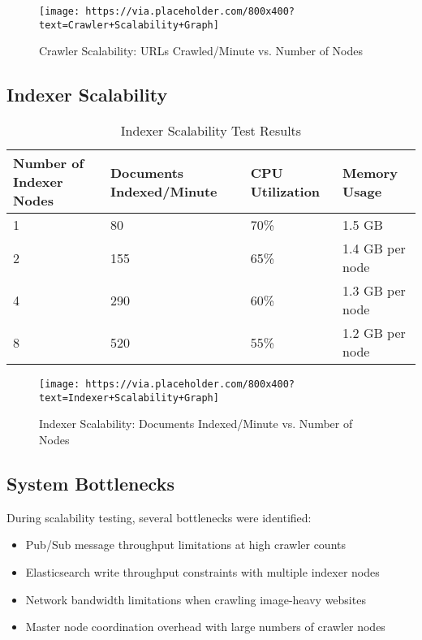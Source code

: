 \documentclass[12pt,a4paper]{report}
\begin{document}
\begin{figure}[H]
    \centering
    \texttt{[image: https://via.placeholder.com/800x400?text=Crawler+Scalability+Graph]}
    \caption{Crawler Scalability: URLs Crawled/Minute vs. Number of Nodes}
\end{figure}

\subsection{Indexer Scalability}
\begin{table}[H]
    \centering
    \begin{tabularx}{\textwidth}{|X|X|X|X|}
        \hline
        \textbf{Number of Indexer Nodes} & \textbf{Documents Indexed/Minute} & \textbf{CPU Utilization} & \textbf{Memory Usage} \\
        \hline
        1 & 80 & 70\% & 1.5 GB \\
        \hline
        2 & 155 & 65\% & 1.4 GB per node \\
        \hline
        4 & 290 & 60\% & 1.3 GB per node \\
        \hline
        8 & 520 & 55\% & 1.2 GB per node \\
        \hline
    \end{tabularx}
    \caption{Indexer Scalability Test Results}
\end{table}

\begin{figure}[H]
    \centering
    \texttt{[image: https://via.placeholder.com/800x400?text=Indexer+Scalability+Graph]}
    \caption{Indexer Scalability: Documents Indexed/Minute vs. Number of Nodes}
\end{figure}

\subsection{System Bottlenecks}
During scalability testing, several bottlenecks were identified:
\begin{itemize}
    \item Pub/Sub message throughput limitations at high crawler counts
    \item Elasticsearch write throughput constraints with multiple indexer nodes
    \item Network bandwidth limitations when crawling image-heavy websites
    \item Master node coordination overhead with large numbers of crawler nodes
\end{itemize}
\end{document}
